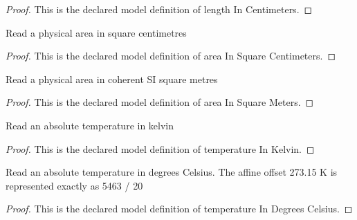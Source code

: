 \begin{proof}
  This is the declared model definition of length In Centimeters.
\end{proof}
\begin{definition}
  \label{def:physics:phyx-mini-0465:phyxminiproblems-problemphyxmini0465-areainsquarecentimeters}
  Read a physical area in square centimetres
\end{definition}
\begin{proof}
  This is the declared model definition of area In Square Centimeters.
\end{proof}
\begin{definition}
  \label{def:physics:phyx-mini-0465:phyxminiproblems-problemphyxmini0465-areainsquaremeters}
  Read a physical area in coherent SI square metres
\end{definition}
\begin{proof}
  This is the declared model definition of area In Square Meters.
\end{proof}
\begin{definition}
  \label{def:physics:phyx-mini-0465:phyxminiproblems-problemphyxmini0465-temperatureinkelvin}
  Read an absolute temperature in kelvin
\end{definition}
\begin{proof}
  This is the declared model definition of temperature In Kelvin.
\end{proof}
\begin{definition}
  \label{def:physics:phyx-mini-0465:phyxminiproblems-problemphyxmini0465-temperatureindegreescelsius}
  Read an absolute temperature in degrees Celsius. The affine offset 273.15 K is represented exactly as 5463 / 20
\end{definition}
\begin{proof}
  This is the declared model definition of temperature In Degrees Celsius.
\end{proof}
